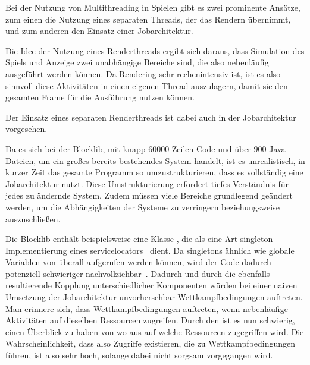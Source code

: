 Bei der Nutzung von Multithreading in Spielen gibt es zwei prominente Ansätze, zum einen die Nutzung eines separaten Threads, der das Rendern übernimmt, und zum anderen den Einsatz einer Jobarchitektur.

Die Idee der Nutzung eines Renderthreads ergibt sich daraus, dass Simulation des Spiels und Anzeige zwei unabhängige Bereiche sind, die also nebenläufig ausgeführt werden können. Da Rendering sehr rechenintensiv ist, ist es also sinnvoll diese Aktivitäten in einen eigenen Thread auszulagern, damit sie den gesamten Frame für die Ausführung nutzen können.

Der Einsatz eines separaten Renderthreads ist dabei auch in der Jobarchitektur vorgesehen.

Da es sich bei der Blocklib, mit knapp $60000$ Zeilen Code und über $900$ Java Dateien, um ein großes bereits bestehendes System handelt, ist es unrealistisch, in kurzer Zeit das gesamte Programm so umzustrukturieren, dass es vollständig eine Jobarchitektur nutzt. Diese Umstrukturierung erfordert tiefes Verständnis für jedes zu ändernde System. Zudem müssen viele Bereiche grundlegend geändert werden, um die Abhängigkeiten der Systeme zu verringern beziehungsweise auszuschließen.

Die Blocklib enthält beispielsweise eine Klasse , die als eine Art \gls{singleton}-Implementierung eines \glspl{servicelocator}~\cite[S.~301~ff.]{Nystrom2015} dient. Da \glspl{singleton} ähnlich wie globale Variablen von überall aufgerufen werden können, wird der Code dadurch potenziell schwieriger nachvollziehbar~\cite[S.~108]{Nystrom2015}. Dadurch und durch die ebenfalls resultierende Kopplung unterschiedlicher Komponenten würden bei einer naiven Umsetzung der Jobarchitektur unvorhersehbar Wettkampfbedingungen auftreten.
Man erinnere sich, dass Wettkampfbedingungen auftreten, wenn nebenläufige Aktivitäten auf dieselben Ressourcen zugreifen. Durch den  ist es nun schwierig, einen Überblick zu haben von wo aus auf welche Ressourcen zugegriffen wird. Die Wahrscheinlichkeit, dass also Zugriffe existieren, die zu Wettkampfbedingungen führen, ist also sehr hoch, solange dabei nicht sorgsam vorgegangen wird.
